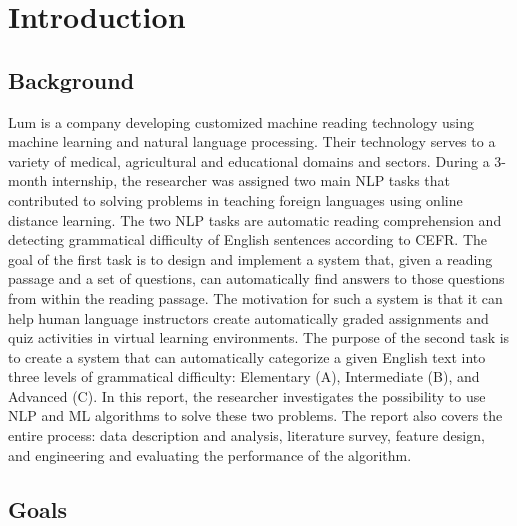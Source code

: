 
\chapter{Introduction} %

\label{Chapter1} %


\section{Background}

Lum is a company developing customized machine reading technology using machine learning and natural language processing. Their technology serves to a variety of medical, agricultural and educational domains and sectors. During a 3-month internship, the researcher was assigned two main NLP tasks that contributed to solving problems in teaching foreign languages using online distance learning. The two NLP tasks are automatic reading comprehension and detecting grammatical difficulty of English sentences according to CEFR. The goal of the first task is to design and implement a system that, given a reading passage and a set of questions, can automatically find answers to those questions from within the reading passage. The motivation for such a system is that it can help human
language instructors create automatically graded assignments and quiz activities
in virtual learning environments. The purpose of the second task is to create a system that can automatically categorize a given English text into three
levels of grammatical difficulty: Elementary (A), Intermediate (B), and Advanced (C). In this report, the researcher investigates the possibility to use NLP and ML algorithms to solve these two problems. The report also covers the entire process: data description and analysis, literature survey, feature design, and engineering and evaluating the performance of the algorithm. 

\section{Goals}

